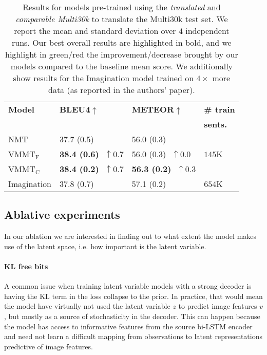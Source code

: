 \documentclass[11pt,a4paper]{article}
\newcommand{\green}[1]{\textcolor{OliveGreen}{#1}}
\newcommand{\white}[1]{\textcolor{White}{#1}}
\newcommand{\cond}{VMMT$_{\text{C}}$\xspace}
\newcommand{\uncond}{VMMT$_{\text{F}}$\xspace}
\begin{document}
\begin{table}[t!]
\centering
\resizebox{\linewidth}{!} {
\begin{tabular}{llll}
\toprule
{\bf Model} & {\bf BLEU4$\uparrow$} & {\bf METEOR$\uparrow$} & \bf \# train \\
&&& \bf sents. \\
\midrule
NMT  &
    37.7 (0.5) & 56.0 (0.3) & \multirow{3}{*}{$145$K}\\

\uncond  &
	{\bf 38.4 (0.6)} \white{-}\green{$\uparrow 0.7$} &
    56.0 (0.3) \white{-}\green{$\uparrow 0.0$} \\

\cond  &
	{\bf 38.4 (0.2)} \white{-}\green{$\uparrow 0.7$} &
    {\bf 56.3 (0.2)} \white{-}\green{$\uparrow 0.3$} \\

\midrule
Imagination &
	37.8 (0.7) &  57.1 (0.2) & $654$K \\
\bottomrule
\end{tabular}
}
\caption{Results for models pre-trained using the \emph{translated} and \emph{comparable Multi30k} to translate the Multi30k test set. We report the mean and standard deviation over $4$ independent runs.
Our best overall results are highlighted in bold, and we highlight in green/red the improvement/decrease brought by our models compared to the baseline mean score.
We additionally show results for the Imagination model trained on $4\times$ more data (as reported in the authors' paper).}
\label{tab:backtrans_results}
\end{table}






\subsection{Ablative experiments}
In our ablation we are interested in finding out to what extent the model makes use of the latent space, i.e. how important is the latent variable.



\paragraph{KL free bits}


A common issue when training latent variable models with a strong decoder is having the KL term in the loss collapse to the prior.
In practice, that would mean the model have virtually not used the latent variable $z$ to predict image features $v$, but mostly as a source of stochasticity in the decoder.
This can happen because the model has access to informative features from the source bi-LSTM encoder and need not learn a difficult mapping from observations to latent representations predictive of image features.
\end{document}
